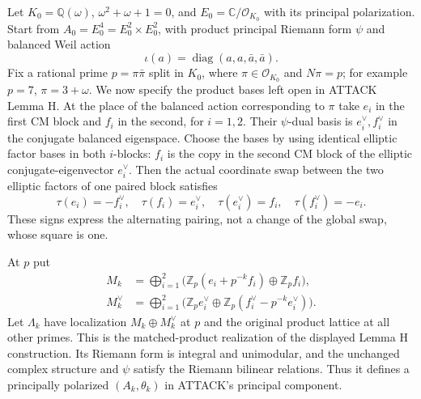 Let $K_0=\mathbb Q(\omega)$, $\omega^2+\omega+1=0$, and
$E_0=\mathbb C/\mathcal O_{K_0}$ with its principal polarization.
Start from $A_0=E_0^4=E_0^2\times E_0^2$, with product principal
Riemann form $\psi$ and balanced Weil action
\[
 \iota(a)=\operatorname{diag}(a,a,\bar a,\bar a).
 \tag{F1T2.1}
\]
Fix a rational prime $p=\pi\bar\pi$ split in $K_0$, where
$\pi\in\mathcal O_{K_0}$ and $N\pi=p$; for example
$p=7$, $\pi=3+\omega$.
We now specify the product bases left open in ATTACK Lemma H.
At the place of the balanced action corresponding to $\pi$ take
$e_i$ in the first CM block and $f_i$ in the second, for $i=1,2$.
Their $\psi$-dual basis is $e_i^\vee,f_i^\vee$ in the conjugate
balanced eigenspace. Choose the bases by using identical elliptic
factor bases in both $i$-blocks: $f_i$ is the copy in the second
CM block of the elliptic conjugate-eigenvector $e_i^\vee$.
Then the actual coordinate swap between the two elliptic factors of
one paired block satisfies
\[
 \tau(e_i)=-f_i^\vee,\quad \tau(f_i)=e_i^\vee,
 \quad \tau(e_i^\vee)=f_i,\quad \tau(f_i^\vee)=-e_i.
 \tag{F1T2.2}
\]
These signs express the alternating pairing, not a change of the
global swap, whose square is one.

At $p$ put
\[
 \begin{split}
 M_k&=\bigoplus_{i=1}^2
       \bigl(\mathbb Z_p(e_i+p^{-k}f_i)\oplus\mathbb Z_p f_i\bigr),\\
 M_k^\vee&=\bigoplus_{i=1}^2
       \bigl(\mathbb Z_p e_i^\vee\oplus
                  \mathbb Z_p(f_i^\vee-p^{-k}e_i^\vee)\bigr).
 \end{split}                                                    \tag{F1T2.3}
\]
Let $\Lambda_k$ have localization $M_k\oplus M_k^\vee$ at $p$
and the original product lattice at all other primes.
This is the matched-product realization of the displayed Lemma H
construction. Its Riemann form is integral and unimodular, and the
unchanged complex structure and $\psi$ satisfy the Riemann bilinear
relations. Thus it defines a principally polarized
$(A_k,\theta_k)$ in ATTACK's principal component.

